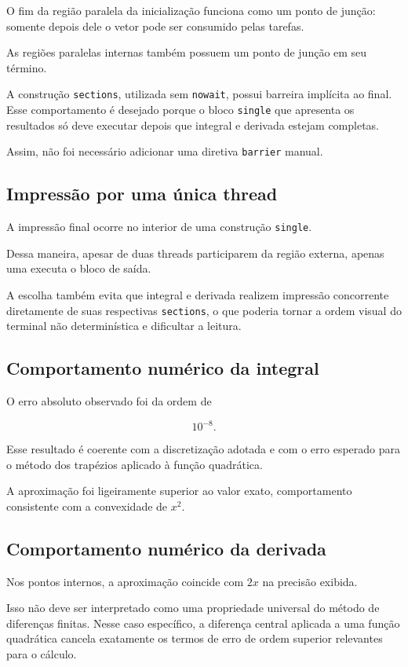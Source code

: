 O fim da região paralela da inicialização funciona como um ponto de junção:
somente depois dele o vetor pode ser consumido pelas tarefas.

As regiões paralelas internas também possuem um ponto de junção em seu
término.

A construção \texttt{sections}, utilizada sem \texttt{nowait}, possui
barreira implícita ao final. Esse comportamento é desejado porque o bloco
\texttt{single} que apresenta os resultados só deve executar depois que
integral e derivada estejam completas.

Assim, não foi necessário adicionar uma diretiva \texttt{barrier} manual.


\subsection{Impressão por uma única thread}

A impressão final ocorre no interior de uma construção \texttt{single}.

Dessa maneira, apesar de duas threads participarem da região externa, apenas
uma executa o bloco de saída.

A escolha também evita que integral e derivada realizem impressão concorrente
diretamente de suas respectivas \texttt{sections}, o que poderia tornar a
ordem visual do terminal não determinística e dificultar a leitura.


\subsection{Comportamento numérico da integral}

O erro absoluto observado foi da ordem de

\[
10^{-8}.
\]

Esse resultado é coerente com a discretização adotada e com o erro esperado
para o método dos trapézios aplicado à função quadrática.

A aproximação foi ligeiramente superior ao valor exato, comportamento
consistente com a convexidade de $x^2$.


\subsection{Comportamento numérico da derivada}

Nos pontos internos, a aproximação coincide com $2x$ na precisão exibida.

Isso não deve ser interpretado como uma propriedade universal do método de
diferenças finitas. Nesse caso específico, a diferença central aplicada a uma
função quadrática cancela exatamente os termos de erro de ordem superior
relevantes para o cálculo.

